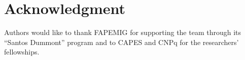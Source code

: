 \documentclass[runningheads,a4paper]{llncs}
\begin{document}









\section*{Acknowledgment}
\label{sec:ack}
Authors would like to thank FAPEMIG for supporting the team through its ``Santos Dummont'' program and to CAPES and CNPq for the researchers' fellowships.


%

\end{document}
